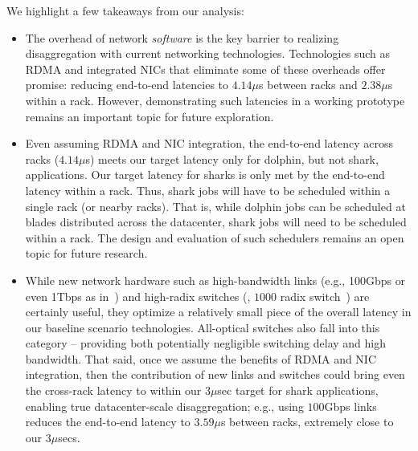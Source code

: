  We highlight a few takeaways from our analysis:
%
\begin{itemize}[leftmargin=*]
\itemsep0em
	\item The overhead of network \emph{software} is the key barrier to realizing disaggregation with current networking technologies. Technologies such as RDMA and integrated NICs that eliminate some of these overheads offer promise: reducing end-to-end latencies to $4.14\mu$s between racks and $2.38\mu$s within a rack. However, demonstrating such latencies in a working prototype remains an important topic for future exploration.
	\item Even assuming RDMA and NIC integration, the end-to-end latency across racks ($4.14\mu$s) meets our target latency only for dolphin, but not shark, applications. Our target latency for sharks is only met by the end-to-end latency within a rack. Thus, shark jobs will have to be scheduled within a single rack (or nearby racks).
	That is, while dolphin jobs can be scheduled at blades distributed across the datacenter, shark jobs will need to be scheduled within a rack. The design and evaluation of such schedulers remains an open topic for future research.
	\item While new network hardware such as high-bandwidth links (e.g., 100Gbps or even 1Tbps as in~\cite{vladimir, firebox}) and high-radix switches (\eg, $1000$ radix switch~\cite{firebox})  are certainly useful, they optimize a relatively small piece of the overall latency in our baseline scenario technologies. All-optical switches also fall into this category -- providing both potentially negligible switching delay and high bandwidth. That said, once we assume the benefits of RDMA and NIC integration, then the contribution of new links and switches could bring even the cross-rack latency to within our 3$\mu$sec target for shark applications, enabling true datacenter-scale disaggregation; e.g., using $100$Gbps links reduces the end-to-end latency to $3.59\mu$s between racks, extremely close to our 3$\mu$secs. 

\end{itemize}
